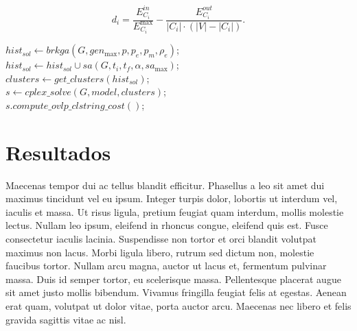 \documentclass{sciposter}
\begin{document}
\begin{multicols}{3}
    \begin{equation}
    \label{eq:clst_goodness}
    d_i = \frac{E_{C_i}^{in}}{E_{C_i}^{\max}} -
        \frac{E_{C_i}^{out}}{|C_i| \cdot (|V| - |C_i|)}.
    \end{equation}

\begin{algorithm}[H]
    \label{alg:matheuristic}
    \Begin
    {
    $hist_{sol} \gets brkga(G, gen_{\max}, p, p_e, p_m, \rho_e)$;\\
        \label{alg:math:row:brkga}
    $hist_{sol} \gets hist_{sol} \cup sa(G, t_i, t_f, \alpha, sa_{\max})$;\\
        \label{alg:math:row:sa}
    $clusters \gets get\_clusters(hist_{sol})$\label{alg:math:row:getc};\\
    $s \gets cplex\_solve(G, model, clusters)$\label{alg:math:row:cplex};\\
    $s.compute\_ovlp\_clstring\_cost()$\label{alg:math:row:cost};\\
    \; 
    }
\end{algorithm}

\section{Resultados}

Maecenas tempor dui ac tellus blandit efficitur. Phasellus a leo sit amet dui maximus tincidunt vel eu ipsum. Integer turpis dolor, lobortis ut interdum vel, iaculis et massa. Ut risus ligula, pretium feugiat quam interdum, mollis molestie lectus. Nullam leo ipsum, eleifend in rhoncus congue, eleifend quis est. Fusce consectetur iaculis lacinia. Suspendisse non tortor et orci blandit volutpat maximus non lacus. Morbi ligula libero, rutrum sed dictum non, molestie faucibus tortor. Nullam arcu magna, auctor ut lacus et, fermentum pulvinar massa. Duis id semper tortor, eu scelerisque massa. Pellentesque placerat augue sit amet justo mollis bibendum. Vivamus fringilla feugiat felis at egestas. Aenean erat quam, volutpat ut dolor vitae, porta auctor arcu. Maecenas nec libero et felis gravida sagittis vitae ac nisl.


\end{multicols}
\end{document}
